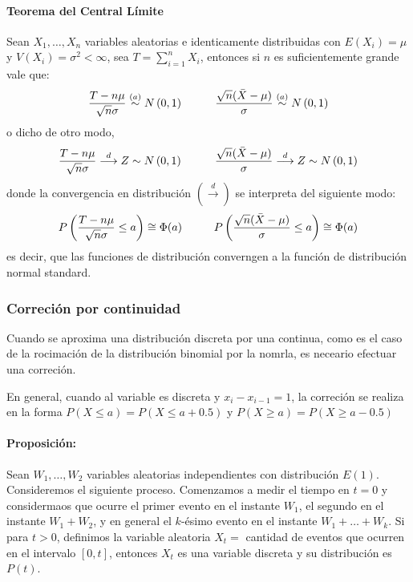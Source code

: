 \paragraph{Teorema del Central Límite}
Sean $X_1,\dots,X_n$ variables aleatorias e identicamente distribuidas con $E(X_i) = \mu$ y $V(X_i) = \sigma^2 < \infty$, sea $T =  \sum_{i=1}^{n}X_i$, entonces si $n$ es suficientemente grande vale que:
$$\frac{T-n\mu}{\sqrt{n}\sigma}\overset{(a)}{\sim} N\left(0,1\right)\hspace*{1cm}\frac{\sqrt{n}(\bar{X}-\mu)}{\sigma}\overset{(a)}{\sim} N\left(0,1\right)$$
o dicho de otro modo,
$$\frac{T-n\mu}{\sqrt{n}\sigma}\overset{d}{\longrightarrow} Z\sim N\left(0,1\right)\hspace*{1cm}\frac{\sqrt{n}(\bar{X}-\mu)}{\sigma}\overset{d}{\longrightarrow} Z\sim N\left(0,1\right)$$
donde la convergencia en distribución $(\overset{d}{\longrightarrow})$ se interpreta del siguiente modo:
$$P\left(\frac{T-n\mu}{\sqrt{n}\sigma} \leq a\right) \cong \Phi(a)\hspace*{1cm} P\left(\frac{\sqrt{n}(\bar{X}-\mu)}{\sigma} \leq a\right) \cong \Phi(a)$$
es decir, que las funciones de distribución converngen a la función de distribución normal standard.

\subsubsection{Correción por continuidad}
Cuando se aproxima una distribución discreta por una continua, como es el caso de la rocimación de la distribución binomial por la nomrla, es neceario efectuar una correción.

En general, cuando al variable es discreta y $x_i-x_{i-1} = 1$,  la correción se realiza en la forma $P(X\leq a) = P(X \leq a + 0.5)$ y $P(X\geq a) = P(X \geq a - 0.5)$

\paragraph{Proposición:} Sean $W_1,\dots,W_2$ variables aleatorias independientes con distribución $E(1)$. Consideremos el siguiente proceso. Comenzamos a medir el tiempo en $t=0$ y considermaos que ocurre el primer evento en el instante $W_1$, el segundo en el instante $W_1+W_2$, y en general el $k$-ésimo evento en el instante $W_1+\dots+W_k$. Si para $t > 0$, definimos la variable aleatoria $X_t = $ cantidad de eventos que ocurren en el intervalo $[0,t]$, entonces $X_t$ es una variable discreta y su distribución es $P(t)$.